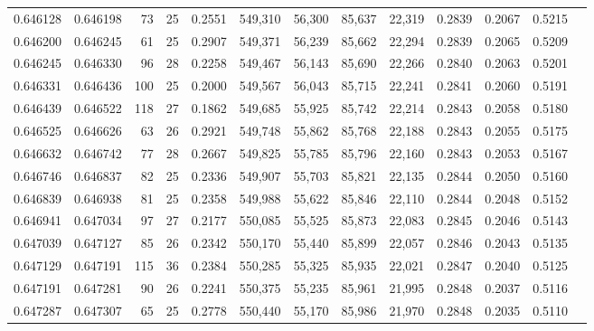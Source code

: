 \begin{tabular}{rrrrrrrrrrrrr}
0.646128 & 0.646198 &  73 &  25 &                                     0.2551 & 549,310 &  56,300 &  85,637 &  22,319 & 0.2839 & 0.2067 & 0.5215 \\
0.646200 & 0.646245 &  61 &  25 &                                     0.2907 & 549,371 &  56,239 &  85,662 &  22,294 & 0.2839 & 0.2065 & 0.5209 \\
0.646245 & 0.646330 &  96 &  28 &                                     0.2258 & 549,467 &  56,143 &  85,690 &  22,266 & 0.2840 & 0.2063 & 0.5201 \\
0.646331 & 0.646436 & 100 &  25 &                                     0.2000 & 549,567 &  56,043 &  85,715 &  22,241 & 0.2841 & 0.2060 & 0.5191 \\
0.646439 & 0.646522 & 118 &  27 &                                     0.1862 & 549,685 &  55,925 &  85,742 &  22,214 & 0.2843 & 0.2058 & 0.5180 \\
0.646525 & 0.646626 &  63 &  26 &                                     0.2921 & 549,748 &  55,862 &  85,768 &  22,188 & 0.2843 & 0.2055 & 0.5175 \\
0.646632 & 0.646742 &  77 &  28 &                                     0.2667 & 549,825 &  55,785 &  85,796 &  22,160 & 0.2843 & 0.2053 & 0.5167 \\
0.646746 & 0.646837 &  82 &  25 &                                     0.2336 & 549,907 &  55,703 &  85,821 &  22,135 & 0.2844 & 0.2050 & 0.5160 \\
0.646839 & 0.646938 &  81 &  25 &                                     0.2358 & 549,988 &  55,622 &  85,846 &  22,110 & 0.2844 & 0.2048 & 0.5152 \\
0.646941 & 0.647034 &  97 &  27 &                                     0.2177 & 550,085 &  55,525 &  85,873 &  22,083 & 0.2845 & 0.2046 & 0.5143 \\
0.647039 & 0.647127 &  85 &  26 &                                     0.2342 & 550,170 &  55,440 &  85,899 &  22,057 & 0.2846 & 0.2043 & 0.5135 \\
0.647129 & 0.647191 & 115 &  36 &                                     0.2384 & 550,285 &  55,325 &  85,935 &  22,021 & 0.2847 & 0.2040 & 0.5125 \\
0.647191 & 0.647281 &  90 &  26 &                                     0.2241 & 550,375 &  55,235 &  85,961 &  21,995 & 0.2848 & 0.2037 & 0.5116 \\
0.647287 & 0.647307 &  65 &  25 &                                     0.2778 & 550,440 &  55,170 &  85,986 &  21,970 & 0.2848 & 0.2035 & 0.5110 \\

\end{tabular}

